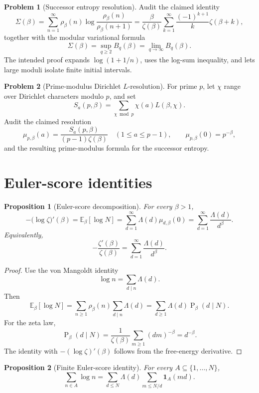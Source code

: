 \documentclass[11pt]{article}
\newtheorem{proposition}{Proposition}
\theoremstyle{definition}
\newtheorem{problem}{Problem}
\theoremstyle{remark}
\DeclareMathOperator{\Prob}{P}
\newcommand{\E}{\mathbb E}
\newcommand{\1}{\mathbf 1}
\begin{document}
\begin{problem}[Successor entropy resolution]
Audit the claimed identity
\[
\Sigma(\beta)
=\sum_{n=1}^{\infty}\rho_\beta(n)
\log\frac{\rho_\beta(n)}{\rho_\beta(n+1)}
=\frac{\beta}{\zeta(\beta)}
\sum_{k=1}^{\infty}\frac{(-1)^{k+1}}{k}\zeta(\beta+k),
\]
together with the modular variational formula
\[
\Sigma(\beta)=\sup_{q\ge2}B_q(\beta)=\lim_{q\to\infty}B_q(\beta).
\]
The intended proof expands \(\log(1+1/n)\), uses the log-sum inequality, and lets large moduli isolate finite initial intervals.
\end{problem}

\begin{problem}[Prime-modulus Dirichlet \(L\)-resolution]
For prime \(p\), let \(\chi\) range over Dirichlet characters modulo \(p\), and set
\[
S_a(p,\beta)=\sum_{\chi\bmod p}\chi(a)L(\beta,\chi).
\]
Audit the claimed resolution
\[
\mu_{p,\beta}(a)=\frac{S_a(p,\beta)}{(p-1)\zeta(\beta)}
\quad (1\le a\le p-1),
\qquad
\mu_{p,\beta}(0)=p^{-\beta},
\]
and the resulting prime-modulus formula for the successor entropy.
\end{problem}

\section{Euler-score identities}

\begin{proposition}[Euler-score decomposition]
For every \(\beta>1\),
\[
-\bigl(\log\zeta\bigr)'(\beta)
=\E_\beta[\log N]
=\sum_{d=1}^{\infty}\Lambda(d)\mu_{d,\beta}(0)
=\sum_{d=1}^{\infty}\frac{\Lambda(d)}{d^\beta}.
\]
Equivalently,
\[
-\frac{\zeta'(\beta)}{\zeta(\beta)}
=\sum_{d=1}^{\infty}\frac{\Lambda(d)}{d^\beta}.
\]
\end{proposition}

\begin{proof}
Use the von Mangoldt identity
\[
\log n=\sum_{d\mid n}\Lambda(d).
\]
Then
\[
\E_\beta[\log N]
=\sum_{n\ge1}\rho_\beta(n)\sum_{d\mid n}\Lambda(d)
=\sum_{d\ge1}\Lambda(d)\Prob_\beta(d\mid N).
\]
For the zeta law,
\[
\Prob_\beta(d\mid N)
=\frac{1}{\zeta(\beta)}\sum_{m\ge1}(dm)^{-\beta}
=d^{-\beta}.
\]
The identity with \(-(\log\zeta)'(\beta)\) follows from the free-energy derivative.
\end{proof}

\begin{proposition}[Finite Euler-score identity]
For every \(A\subseteq\{1,\ldots,N\}\),
\[
\sum_{n\in A}\log n
=\sum_{d\le N}\Lambda(d)\sum_{m\le N/d}\1_A(md).
\]
\end{proposition}
\end{document}

